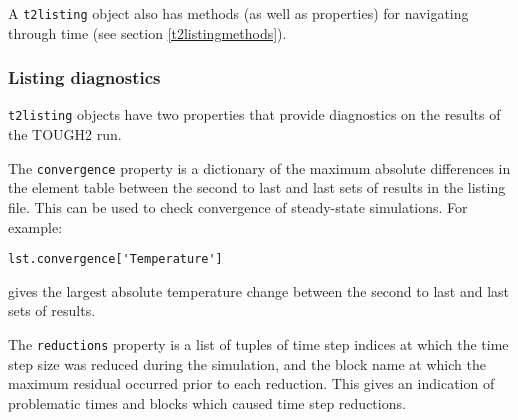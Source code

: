 A \texttt{t2listing} object also has methods (as well as properties) for navigating through time (see section \ref{t2listingmethods}).

\subsubsection{Listing diagnostics}

\texttt{t2listing} objects have two properties that provide diagnostics on the results of the TOUGH2 run.

The \texttt{convergence} property is a dictionary of the maximum absolute differences in the element table between the second to last and last sets of results in the listing file.  This can be used to check convergence of steady-state simulations.  For example:

\begin{lstlisting}
lst.convergence['Temperature']
\end{lstlisting}

gives the largest absolute temperature change between the second to last and last sets of results.

The \texttt{reductions} property is a list of tuples of time step indices at which the time step size was reduced during the simulation, and the block name at which the maximum residual occurred prior to each reduction.  This gives an indication of problematic times and blocks which caused time step reductions.

